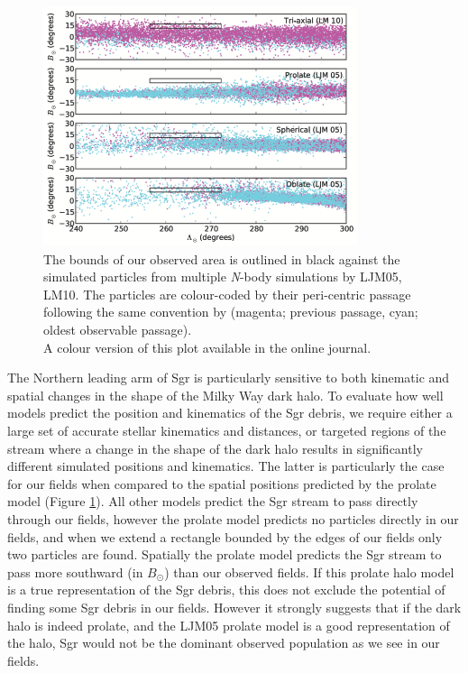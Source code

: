 \documentclass{emulateapj}
\begin{document}
		\begin{figure}[h]
			\centering
			\includegraphics[width=9.2cm]{./figures/law_spatial_copy.eps} 
			\caption{The bounds of our observed area is outlined in black against the simulated particles from multiple \textit{N}-body simulations by LJM05, LM10. The particles are colour-coded by their peri-centric passage following the same convention by \citet{Law;Majewski_2010} (magenta; previous passage, cyan; oldest observable passage). \\ A colour version of this plot available in the online journal.}
			\label{fig:law-spatial}
		\end{figure}
	
	The Northern leading arm of Sgr is particularly sensitive to both kinematic and spatial changes in the shape of the Milky Way dark halo. To evaluate how well models predict the position and kinematics of the Sgr debris, we require either a large set of accurate stellar kinematics and distances, or targeted regions of the stream where a change in the shape of the dark halo results in significantly different simulated positions and kinematics. The latter is particularly the case for our fields when compared to the spatial positions predicted by the prolate model (Figure \ref{fig:law-spatial}).  All other models predict the Sgr stream to pass directly through our fields, however the prolate model predicts no particles directly in our fields, and when we extend a rectangle bounded by the edges of our fields only two particles are found. Spatially the prolate model predicts the Sgr stream to pass more southward (in $B_\odot$) than our observed fields. If this prolate halo model is a true representation of the Sgr debris, this does not exclude the potential of finding some Sgr debris in our fields. However it strongly suggests that if the dark halo is indeed prolate, and the LJM05 prolate model is a good representation of the halo, Sgr would not be the dominant observed population as we see in our fields.
	
\end{document}
